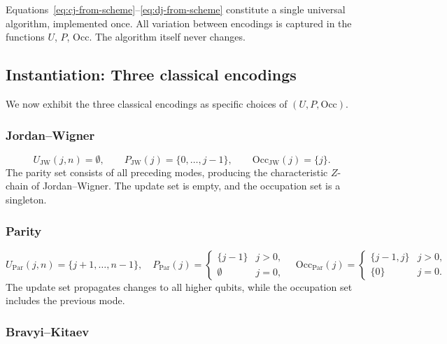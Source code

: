 \begin{remark}
Equations~\eqref{eq:cj-from-scheme}--\eqref{eq:dj-from-scheme}
constitute a single universal algorithm, implemented once.  All
variation between encodings is captured in the functions $U$, $P$,
$\mathrm{Occ}$.  The algorithm itself never changes.
\end{remark}

\subsection{Instantiation: Three classical encodings}

We now exhibit the three classical encodings as specific choices of
$(U, P, \mathrm{Occ})$.

\subsubsection{Jordan--Wigner}

\begin{equation}
  U_{\text{JW}}(j, n) = \emptyset, \qquad
  P_{\text{JW}}(j) = \{0, \ldots, j{-}1\}, \qquad
  \mathrm{Occ}_{\text{JW}}(j) = \{j\}.
  \label{eq:jw-scheme}
\end{equation}
The parity set consists of all preceding modes, producing the
characteristic $Z$-chain of Jordan--Wigner.  The update set is empty,
and the occupation set is a singleton.

\subsubsection{Parity}

\begin{equation}
  U_{\text{Par}}(j, n) = \{j{+}1, \ldots, n{-}1\}, \quad
  P_{\text{Par}}(j) =
    \begin{cases}
      \{j{-}1\} & j > 0, \\
      \emptyset & j = 0,
    \end{cases}
  \quad
  \mathrm{Occ}_{\text{Par}}(j) =
    \begin{cases}
      \{j{-}1, j\} & j > 0, \\
      \{0\} & j = 0.
    \end{cases}
  \label{eq:parity-scheme}
\end{equation}
The update set propagates changes to all higher qubits, while the
occupation set includes the previous mode.

\subsubsection{Bravyi--Kitaev}

